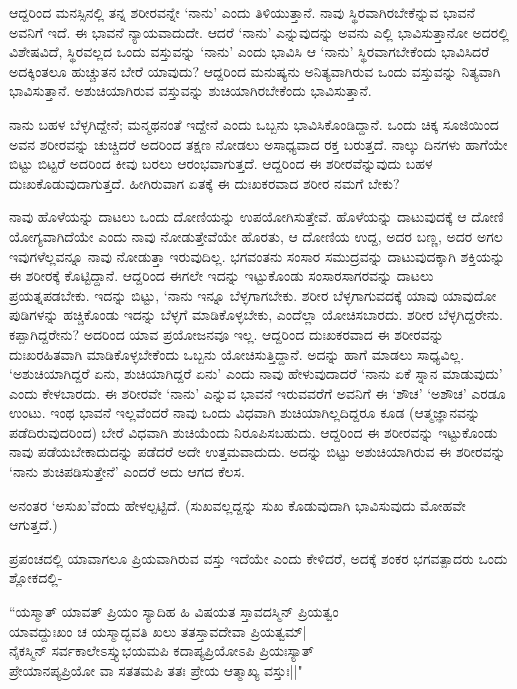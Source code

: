 ಆದ್ದರಿಂದ ಮನಸ್ಸಿನಲ್ಲಿ ತನ್ನ ಶರೀರವನ್ನೇ `ನಾನು' ಎಂದು ತಿಳಿಯುತ್ತಾನೆ. ನಾವು ಸ್ಥಿರವಾಗಿರಬೇಕೆನ್ನುವ ಭಾವನೆ ಅವನಿಗೆ ಇದೆ. ಈ ಭಾವನೆ ನ್ಯಾಯವಾದುದೇ. ಆದರೆ `ನಾನು' ಎನ್ನುವುದನ್ನು ಅವನು ಎಲ್ಲಿ ಭಾವಿಸುತ್ತಾನೋ ಅದರಲ್ಲಿ ವಿಶೇಷವಿದೆ, ಸ್ಥಿರವಲ್ಲದ ಒಂದು ವಸ್ತುವನ್ನು `ನಾನು' ಎಂದು ಭಾವಿಸಿ ಆ `ನಾನು' ಸ್ಥಿರವಾಗಬೇಕೆಂದು ಭಾವಿಸಿದರೆ ಅದಕ್ಕಿಂತಲೂ ಹುಚ್ಚುತನ ಬೇರೆ ಯಾವುದು? ಆದ್ದರಿಂದ ಮನುಷ್ಯನು ಅನಿತ್ಯವಾಗಿರುವ ಒಂದು ವಸ್ತುವನ್ನು ನಿತ್ಯವಾಗಿ ಭಾವಿಸುತ್ತಾನೆ. ಅಶುಚಿಯಾಗಿರುವ ವಸ್ತುವನ್ನು ಶುಚಿಯಾಗಿರಬೇಕೆಂದು ಭಾವಿಸುತ್ತಾನೆ.

ನಾನು ಬಹಳ ಬೆಳ್ಳಗಿದ್ದೇನೆ; ಮನ್ಮಥನಂತೆ ಇದ್ದೇನೆ ಎಂದು ಒಬ್ಬನು ಭಾವಿಸಿಕೊಂಡಿದ್ದಾನೆ. ಒಂದು ಚಿಕ್ಕ ಸೂಜಿಯಿಂದ ಅವನ ಶರೀರವನ್ನು ಚುಚ್ಚಿದರೆ ಅದರಿಂದ ತಕ್ಷಣ ನೋಡಲು ಅಸಾಧ್ಯವಾದ ರಕ್ತ ಬರುತ್ತದೆ. ನಾಲ್ಕು ದಿನಗಳು ಹಾಗೆಯೇ ಬಿಟ್ಟು ಬಿಟ್ಟರೆ ಅದರಿಂದ ಕೀವು ಬರಲು ಆರಂಭವಾಗುತ್ತದೆ. ಆದ್ದರಿಂದ ಈ ಶರೀರವೆನ್ನುವುದು ಬಹಳ ದುಃಖಕೊಡುವುದಾಗುತ್ತದೆ. ಹೀಗಿರುವಾಗ ಏತಕ್ಕೆ ಈ ದುಃಖಕರವಾದ ಶರೀರ ನಮಗೆ ಬೇಕು?

ನಾವು ಹೊಳೆಯನ್ನು ದಾಟಲು ಒಂದು ದೋಣಿಯನ್ನು ಉಪಯೋಗಿಸುತ್ತೇವೆ. ಹೊಳೆಯನ್ನು ದಾಟುವುದಕ್ಕೆ ಆ ದೋಣಿ ಯೋಗ್ಯವಾಗಿದೆಯೇ ಎಂದು ನಾವು ನೋಡುತ್ತೇವೆಯೇ ಹೊರತು, ಆ ದೋಣಿಯ ಉದ್ದ, ಅದರ ಬಣ್ಣ, ಅದರ ಅಗಲ ಇವುಗಳೆಲ್ಲವನ್ನೂ ನಾವು ನೋಡುತ್ತಾ ಇರುವುದಿಲ್ಲ. ಭಗವಂತನು ಸಂಸಾರ ಸಮುದ್ರವನ್ನು ದಾಟುವುದಕ್ಕಾಗಿ ಶಕ್ತಿಯನ್ನು ಈ ಶರೀರಕ್ಕೆ ಕೊಟ್ಟಿದ್ದಾನೆ. ಆದ್ದರಿಂದ ಈಗಲೇ ಇದನ್ನು ಇಟ್ಟುಕೊಂಡು ಸಂಸಾರಸಾಗರವನ್ನು ದಾಟಲು ಪ್ರಯತ್ನಪಡಬೇಕು. ಇದನ್ನು ಬಿಟ್ಟು, `ನಾನು ಇನ್ನೂ ಬೆಳ್ಳಗಾಗಬೇಕು. ಶರೀರ ಬೆಳ್ಳಗಾಗುವದಕ್ಕೆ ಯಾವು ಯಾವುದೋ ಪುಡಿಗಳನ್ನು ಹಚ್ಚಿಕೊಂಡು ಇದನ್ನು ಬೆಳ್ಳಗೆ ಮಾಡಿಕೊಳ್ಳಬೇಕು, ಎಂದೆಲ್ಲಾ ಯೋಚಿಸಬಾರದು. ಶರೀರ ಬೆಳ್ಳಗಿದ್ದರೇನು. ಕಪ್ಪಾಗಿದ್ದರೇನು? ಅದರಿಂದ ಯಾವ ಪ್ರಯೋಜನವೂ ಇಲ್ಲ. ಆದ್ದರಿಂದ ದುಃಖಕರವಾದ ಈ ಶರೀರವನ್ನು ದುಃಖರಹಿತವಾಗಿ ಮಾಡಿಕೊಳ್ಳಬೇಕೆಂದು ಒಬ್ಬನು ಯೋಚಿಸುತ್ತಿದ್ದಾನೆ. ಅದನ್ನು ಹಾಗೆ ಮಾಡಲು ಸಾಧ್ಯವಿಲ್ಲ. `ಅಶುಚಿಯಾಗಿದ್ದರೆ ಏನು, ಶುಚಿಯಾಗಿದ್ದರೆ ಏನು' ಎಂದು ನಾವು ಹೇಳುವುದಾದರೆ `ನಾನು ಏಕೆ ಸ್ನಾನ ಮಾಡುವುದು' ಎಂದು ಕೇಳಬಾರದು. ಈ ಶರೀರವೇ `ನಾನು' ಎನ್ನುವ ಭಾವನೆ ಇರುವವರೆಗೆ ಅವನಿಗೆ ಈ `ಶೌಚ' `ಅಶೌಚ' ಎರಡೂ ಉಂಟು. ಇಂಥ ಭಾವನೆ ಇಲ್ಲವೆಂದರೆ ನಾವು ಒಂದು ವಿಧವಾಗಿ ಶುಚಿಯಾಗಿಲ್ಲದಿದ್ದರೂ ಕೂಡ (ಆತ್ಮಜ್ಞಾನವನ್ನು ಪಡೆದಿರುವುದರಿಂದ) ಬೇರೆ ವಿಧವಾಗಿ ಶುಚಿಯೆಂದು ನಿರೂಪಿಸಬಹುದು. ಆದ್ದರಿಂದ ಈ ಶರೀರವನ್ನು ಇಟ್ಟುಕೊಂಡು ನಾವು ಪಡೆಯಬೇಕಾದುದನ್ನು ಪಡೆದರೆ ಅದೇ ಉತ್ತಮವಾದುದು. ಅದನ್ನು ಬಿಟ್ಟು ಅಶುಚಿಯಾಗಿರುವ ಈ ಶರೀರವನ್ನು `ನಾನು ಶುಚಿಪಡಿಸುತ್ತೇನೆ' ಎಂದರೆ ಅದು ಆಗದ ಕೆಲಸ.

ಅನಂತರ `ಅಸುಖ'ವೆಂದು ಹೇಳಲ್ಪಟ್ಟಿದೆ. (ಸುಖವಲ್ಲದ್ದನ್ನು ಸುಖ ಕೊಡುವುದಾಗಿ ಭಾವಿಸುವುದು ಮೋಹವೇ ಆಗುತ್ತದೆ.)

ಪ್ರಪಂಚದಲ್ಲಿ ಯಾವಾಗಲೂ ಪ್ರಿಯವಾಗಿರುವ ವಸ್ತು ಇದೆಯೇ ಎಂದು ಕೇಳಿದರೆ, ಅದಕ್ಕೆ ಶಂಕರ ಭಗವತ್ಪಾದರು ಒಂದು ಶ್ಲೋಕದಲ್ಲಿ-

\begin{shloka}
``ಯಸ್ಮಾತ್ ಯಾವತ್ ಪ್ರಿಯಂ ಸ್ಯಾದಿಹ ಹಿ ವಿಷಯತ ಸ್ತಾವದಸ್ಮಿನ್ ಪ್ರಿಯತ್ವಂ\\
ಯಾವದ್ದುಃಖಂ ಚ ಯಸ್ಮಾದ್ಭವತಿ ಖಲು ತತಸ್ತಾವದೇವಾ ಪ್ರಿಯತ್ವಮ್|\\
ನೈಕಸ್ಮಿನ್ ಸರ್ವಕಾಲೇಽಸ್ತ್ಯುಭಯಮಪಿ ಕದಾಪ್ಯಪ್ರಿಯೋಽಪಿ ಪ್ರಿಯಃಸ್ಯಾತ್\\
ಪ್ರೇಯಾನಪ್ಯಪ್ರಿಯೋ ವಾ ಸತತಮಪಿ ತತಃ ಪ್ರೇಯ ಆತ್ಮಾಖ್ಯ ವಸ್ತುಃ||"
\end{shloka}

